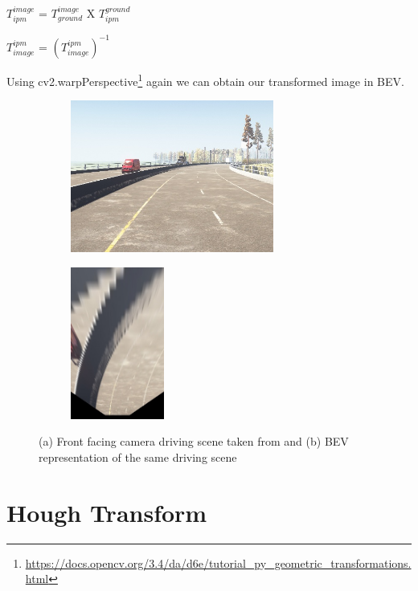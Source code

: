     \begin{center}
    $T^{image}_{ipm}$ = $T^{image}_{ground}$ X $T^{ground}_{ipm}$
    \end{center}
    
    \begin{center}
    $T^{ipm}_{image}$ = $(T^{ipm}_{image})^{-1}$
    \end{center}
    
    Using cv2.warpPerspective\footnote{\url{https://docs.opencv.org/3.4/da/d6e/tutorial_py_geometric_transformations.html}} again we can obtain our transformed image in BEV. 
    
    
\begin{figure}[h]
\centering
\begin{subfigure}{0.6\textwidth}
\includegraphics[width=1\linewidth, height=5cm]{images/report_image.jpg} 
\caption{}
\label{fig:subim1}
\end{subfigure}
\begin{subfigure}{0.4\textwidth}
\includegraphics[width=0.5\linewidth, height=5cm]{images/report_image_ipm.jpg}
\caption{}
\label{fig:subim2}
\end{subfigure}

\caption{(a) Front facing camera driving scene taken from \cite{guo2020gen} and (b) BEV representation of the same driving scene}
\label{fig:image2}
\end{figure}
    
    \section{Hough Transform}
    
